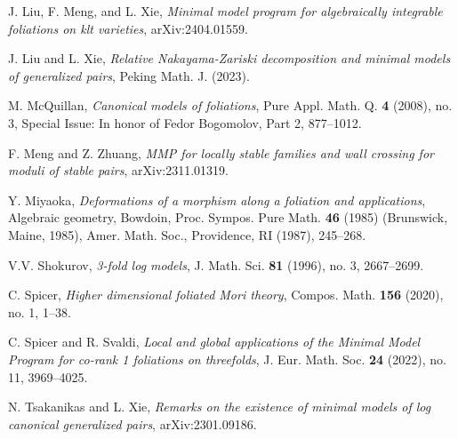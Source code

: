 \documentclass[11pt]{amsart}
\numberwithin{equation}{section}
\theoremstyle{definition}
\theoremstyle{definition}
\theoremstyle{definition}
\begin{document}
\begin{thebibliography}{99}
 J. Liu, F. Meng, and L. Xie, \textit{Minimal model program for algebraically integrable foliations on klt varieties}, arXiv:2404.01559.

 J. Liu and L. Xie, \textit{Relative Nakayama-Zariski decomposition and minimal models of generalized pairs}, Peking Math. J. (2023).


 M. McQuillan, \textit{Canonical models of foliations}, Pure Appl. Math. Q. \textbf{4} (2008), no. 3, Special Issue: In honor of Fedor Bogomolov, Part 2, 877--1012.

 F. Meng and Z. Zhuang, \textit{MMP for locally stable families and wall crossing for moduli of stable pairs}, arXiv:2311.01319.

 Y. Miyaoka, \textit{Deformations of a morphism along a foliation and applications}, Algebraic geometry, Bowdoin, Proc. Sympos. Pure Math. \textbf{46} (1985) (Brunswick, Maine, 1985), Amer. Math. Soc., Providence, RI (1987), 245--268.


 V.V. Shokurov, \textit{3-fold log models}, J. Math. Sci. \textbf{81} (1996), no. 3, 2667--2699.

 C. Spicer, \textit{Higher dimensional foliated Mori theory}, Compos. Math. \textbf{156} (2020), no. 1, 1--38.

 C. Spicer and R. Svaldi, \textit{Local and global applications of the Minimal Model Program for co-rank 1 foliations on threefolds}, J. Eur. Math. Soc. \textbf{24} (2022), no. 11, 3969--4025.

 N. Tsakanikas and L. Xie, \textit{Remarks on the existence of minimal models of log canonical generalized pairs}, arXiv:2301.09186.

\end{thebibliography}
\end{document}
